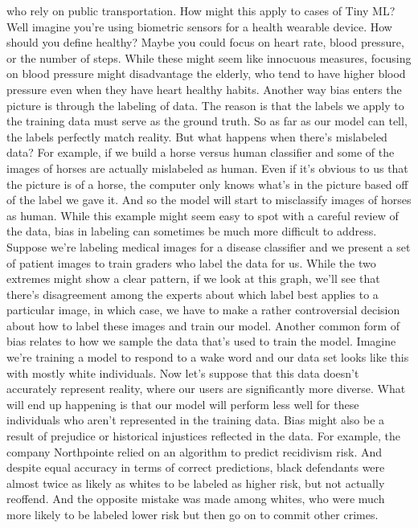 who rely on public transportation.
How might this apply to cases of Tiny ML?
Well imagine you're using biometric sensors for a health wearable device.
How should you define healthy?
Maybe you could focus on heart rate, blood pressure, or the number of steps.
While these might seem like innocuous measures, focusing on blood pressure
might disadvantage the elderly, who tend to have higher blood pressure even when
they have heart healthy habits.
Another way bias enters the picture is through the labeling of data.
The reason is that the labels we apply to the training data
must serve as the ground truth.
So as far as our model can tell, the labels perfectly match reality.
But what happens when there's mislabeled data?
For example, if we build a horse versus human classifier
and some of the images of horses are actually mislabeled as human.
Even if it's obvious to us that the picture is of a horse,
the computer only knows what's in the picture based off
of the label we gave it.
And so the model will start to misclassify images of horses as human.
While this example might seem easy to spot with a careful review of the data,
bias in labeling can sometimes be much more difficult to address.
Suppose we're labeling medical images for a disease classifier
and we present a set of patient images to train
graders who label the data for us.
While the two extremes might show a clear pattern,
if we look at this graph, we'll see that there's
disagreement among the experts about which label best
applies to a particular image, in which case, we
have to make a rather controversial decision about how to label
these images and train our model.
Another common form of bias relates to how
we sample the data that's used to train the model.
Imagine we're training a model to respond to a wake word
and our data set looks like this with mostly white individuals.
Now let's suppose that this data doesn't accurately
represent reality, where our users are significantly more diverse.
What will end up happening is that our model
will perform less well for these individuals who aren't represented
in the training data.
Bias might also be a result of prejudice or historical injustices reflected
in the data.
For example, the company Northpointe relied on an algorithm
to predict recidivism risk.
And despite equal accuracy in terms of correct predictions,
black defendants were almost twice as likely as whites
to be labeled as higher risk, but not actually reoffend.
And the opposite mistake was made among whites,
who were much more likely to be labeled lower risk
but then go on to commit other crimes.
